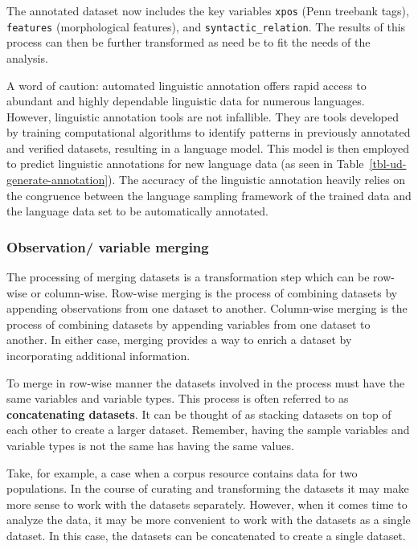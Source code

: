 \documentclass[
  letterpaper,
  DIV=11,
  numbers=noendperiod]{scrreport}
\theoremstyle{definition}
\theoremstyle{remark}
\begin{document}
The annotated dataset now includes the key variables \texttt{xpos} (Penn
treebank tags), \texttt{features} (morphological features), and
\texttt{syntactic\_relation}. The results of this process can then be
further transformed as need be to fit the needs of the analysis.

A word of caution: automated linguistic annotation offers rapid access
to abundant and highly dependable linguistic data for numerous
languages. However, linguistic annotation tools are not infallible. They
are tools developed by training computational algorithms to identify
patterns in previously annotated and verified datasets, resulting in a
language model. This model is then employed to predict linguistic
annotations for new language data (as seen in
Table~\ref{tbl-ud-generate-annotation}). The accuracy of the linguistic
annotation heavily relies on the congruence between the language
sampling framework of the trained data and the language data set to be
automatically annotated.

\hypertarget{sec-ud-obs-variable-merging}{%
\subsubsection{Observation/ variable
merging}\label{sec-ud-obs-variable-merging}}

The processing of merging datasets is a transformation step which can be
row-wise or column-wise. Row-wise merging is the process of combining
datasets by appending observations from one dataset to another.
Column-wise merging is the process of combining datasets by appending
variables from one dataset to another. In either case, merging provides
a way to enrich a dataset by incorporating additional information.

To merge in row-wise manner the datasets involved in the process must
have the same variables and variable types. This process is often
referred to as \textbf{concatenating datasets}. It can be thought of as
stacking datasets on top of each other to create a larger dataset.
Remember, having the sample variables and variable types is not the same
has having the same values.

Take, for example, a case when a corpus resource contains data for two
populations. In the course of curating and transforming the datasets it
may make more sense to work with the datasets separately. However, when
it comes time to analyze the data, it may be more convenient to work
with the datasets as a single dataset. In this case, the datasets can be
concatenated to create a single dataset.
\end{document}
